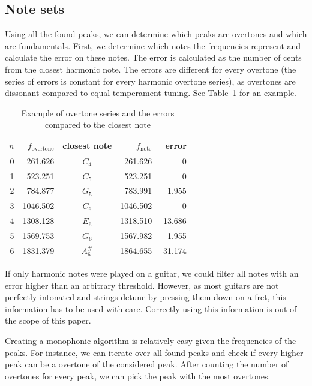 \documentclass[10pt,twocolumn]{article}
\begin{document}
\subsection{Note sets}  \label{sub:impnoteset}
Using all the found peaks, we can determine which peaks are overtones and which are fundamentals. First, we determine which notes the frequencies represent and calculate the error on these notes. The error is calculated as the number of cents from the closest harmonic note. The errors are different for every overtone (the series of errors is constant for every harmonic overtone series), as overtones are dissonant compared to equal temperament tuning. See Table~\ref{tab:overseries} for an example.
\begin{table}[H]\vspace{-3mm}
    \centering
    \begin{tabular}{rrcrr}
        $n$ & $f_{\text{overtone}}$ & closest note & $f_\text{note}$ & error \\
        \hline
        0 & 261.626  & $C_4$    & 261.626  &  0 \\
        1 & 523.251  & $C_5$    & 523.251  &  0 \\
        2 & 784.877  & $G_5$    & 783.991  &  1.955 \\
        3 & 1046.502 & $C_6$    & 1046.502 &  0 \\
        4 & 1308.128 & $E_6$    & 1318.510 &  -13.686 \\
        5 & 1569.753 & $G_6$    & 1567.982 &  1.955 \\
        6 & 1831.379 & $A^\#_6$ & 1864.655 &  -31.174 \\
    \end{tabular}
    \caption{Example of overtone series and the errors compared to the closest note}
    \label{tab:overseries}
\end{table}\vspace{-3mm}
If only harmonic notes were played on a guitar, we could filter all notes with an error higher than an arbitrary threshold. However, as most guitars are not perfectly intonated and strings detune by pressing them down on a fret, this information has to be used with care. Correctly using this information is out of the scope of this paper.

Creating a monophonic algorithm is relatively easy given the frequencies of the peaks. For instance, we can iterate over all found peaks and check if every higher peak can be a overtone of the considered peak. After counting the number of overtones for every peak, we can pick the peak with the most overtones.
\end{document}
